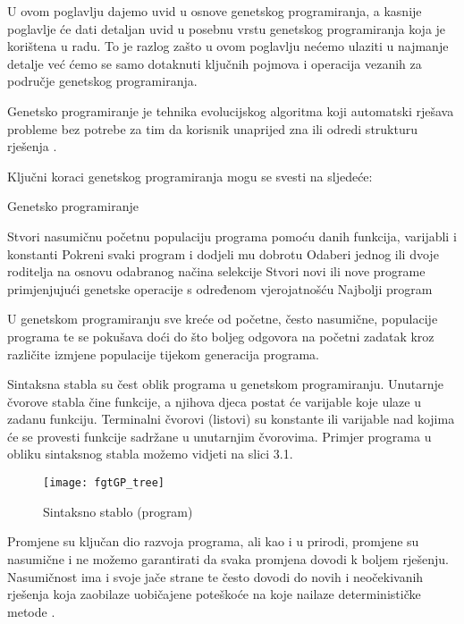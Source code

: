\quad U ovom poglavlju dajemo uvid u osnove genetskog programiranja, a kasnije poglavlje će dati detaljan uvid u posebnu vrstu genetskog programiranja koja je korištena u radu. To je razlog zašto u ovom poglavlju nećemo ulaziti u najmanje detalje već ćemo se samo dotaknuti ključnih pojmova i operacija vezanih za područje genetskog programiranja.\par
Genetsko programiranje je tehnika evolucijskog algoritma koji automatski rješava probleme bez potrebe za tim da korisnik unaprijed zna ili odredi strukturu rješenja \cite{fieldguidtoGP}. \par 
Ključni koraci genetskog programiranja mogu se svesti na sljedeće:
\begin{algorithm}
	\caption{Genetsko programiranje \cite{fieldguidtoGP}}
	\begin{algorithmic}
		\State Stvori nasumičnu početnu populaciju programa pomoću danih funkcija, varijabli i konstanti
		\Repeat 
		\State Pokreni svaki program i dodjeli mu dobrotu
		\State Odaberi jednog ili dvoje roditelja na osnovu odabranog načina selekcije
		\State Stvori novi ili nove programe primjenjujući genetske operacije s određenom 
		\State vjerojatnošću
		\newline
		\Return Najbolji program
	\end{algorithmic}
\end{algorithm}\par 
U genetskom programiranju sve kreće od početne, često nasumične, populacije programa te se pokušava doći do što boljeg odgovora na početni zadatak kroz različite izmjene populacije tijekom generacija programa. 
\par 
Sintaksna stabla su čest oblik programa u genetskom programiranju. Unutarnje čvorove stabla čine funkcije, a njihova djeca postat će varijable koje ulaze u zadanu funkciju. Terminalni čvorovi (listovi) su konstante ili varijable nad kojima će se provesti funkcije sadržane u unutarnjim čvorovima. Primjer programa u obliku sintaksnog stabla možemo vidjeti na slici 3.1.\par
\begin{figure}[h]
	\centering
	\texttt{[image: fgtGP\_tree]}
	\caption{Sintaksno stablo (program) \cite{fieldguidtoGP}}
\end{figure}
 \par 
 Promjene su ključan dio razvoja programa, ali kao i u prirodi, promjene su nasumične i ne možemo garantirati da svaka promjena dovodi k boljem rješenju. Nasumičnost ima i svoje jače strane te često dovodi do novih i neočekivanih rješenja koja zaobilaze uobičajene poteškoće na koje nailaze determinističke metode \cite{fieldguidtoGP}. \par 
